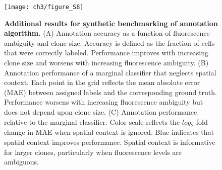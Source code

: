 \begin{figure}[h]
\texttt{[image: ch3/figure\_S8]}
\caption[Additional results for synthetic benchmarking of annotation algorithm.]{\textbf{Additional results for synthetic benchmarking of annotation algorithm.} (A) Annotation accuracy as a function of fluorescence ambiguity and clone size. Accuracy is defined as the fraction of cells that were correctly labeled. Performance improves with increasing clone size and worsens with increasing fluorescence ambiguity. (B) Annotation performance of a marginal classifier that neglects spatial context. Each point in the grid reflects the mean absolute error (MAE) between assigned labels and the corresponding ground truth. Performance worsens with increasing fluorescence ambiguity but does not depend upon clone size. (C) Annotation performance relative to the marginal classifier. Color scale reflects the $log_2$ fold-change in MAE when spatial context is ignored. Blue indicates that spatial context improves performance. Spatial context is informative for larger clones, particularly when fluorescence levels are ambiguous.}
\label{fig:ch3:figS8}
\end{figure}
